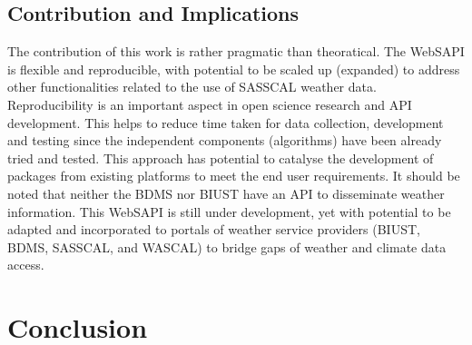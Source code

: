 \documentclass[a4paper, 10pt, conference]{ieeeconf}      %
\begin{document}
\subsection{\textbf{Contribution and Implications}}
\noindent
The contribution of this work is rather pragmatic than theoratical. 
The     WebSAPI is flexible and reproducible,
with potential to be scaled up (expanded) to address other functionalities related to the use of   SASSCAL weather data. 
Reproducibility  is an important aspect in open science research  and API development. 
This helps to reduce time taken for data collection, development and testing since the independent components (algorithms) have been already tried and tested.
This  approach   has   potential to  catalyse the development of   packages  from existing platforms to meet   the end user requirements.
It should be noted that neither the BDMS nor BIUST have an API to disseminate weather information. 
This WebSAPI is still   under development, yet with potential to be adapted and incorporated to portals of weather service providers (BIUST, BDMS, SASSCAL, and WASCAL)   to bridge gaps of weather and climate data access.

	\section{\textbf{Conclusion}}
	\label{Conclu}
	\noindent
\end{document}
